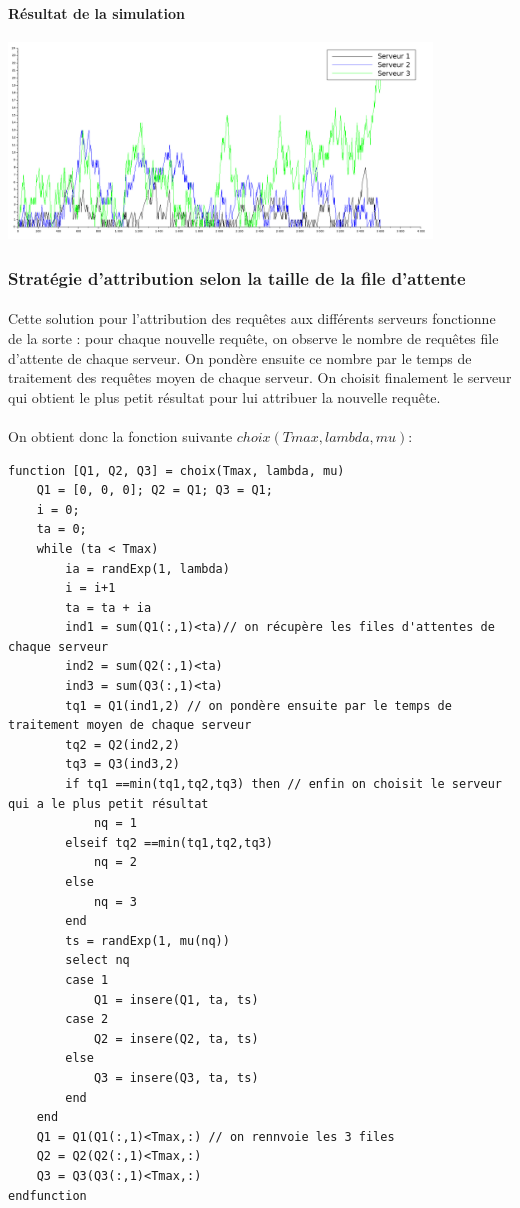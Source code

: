 \documentclass{article}
\begin{document}
\paragraph{Résultat de la simulation}
\begin{center}
	\includegraphics[width=425px]{img/semiCirculaire.png}
\end{center}

\subsubsection{Stratégie d'attribution selon la taille de la file d'attente}

\paragraph{}
Cette solution pour l'attribution des requêtes aux différents serveurs fonctionne de la sorte :  pour chaque nouvelle requête, on observe le nombre de requêtes file d'attente de chaque serveur. On pondère ensuite ce nombre par le temps de traitement des requêtes moyen de chaque serveur. On choisit finalement le serveur qui obtient le plus petit résultat pour lui attribuer la nouvelle requête.

\paragraph{}On obtient donc la fonction suivante $choix(Tmax,lambda,mu)$:
\begin{verbatim}
function [Q1, Q2, Q3] = choix(Tmax, lambda, mu)
    Q1 = [0, 0, 0]; Q2 = Q1; Q3 = Q1;
    i = 0;
    ta = 0; 
    while (ta < Tmax)
        ia = randExp(1, lambda)
        i = i+1 
        ta = ta + ia 
        ind1 = sum(Q1(:,1)<ta)// on récupère les files d'attentes de chaque serveur
        ind2 = sum(Q2(:,1)<ta)
        ind3 = sum(Q3(:,1)<ta)
        tq1 = Q1(ind1,2) // on pondère ensuite par le temps de traitement moyen de chaque serveur
        tq2 = Q2(ind2,2)
        tq3 = Q3(ind3,2)
        if tq1 ==min(tq1,tq2,tq3) then // enfin on choisit le serveur qui a le plus petit résultat
            nq = 1
        elseif tq2 ==min(tq1,tq2,tq3)
            nq = 2
        else
            nq = 3
        end
        ts = randExp(1, mu(nq))
        select nq 
        case 1 
            Q1 = insere(Q1, ta, ts)
        case 2 
            Q2 = insere(Q2, ta, ts)
        else
            Q3 = insere(Q3, ta, ts)
        end
    end
    Q1 = Q1(Q1(:,1)<Tmax,:) // on rennvoie les 3 files
    Q2 = Q2(Q2(:,1)<Tmax,:)
    Q3 = Q3(Q3(:,1)<Tmax,:)
endfunction
\end{verbatim}
\end{document}
